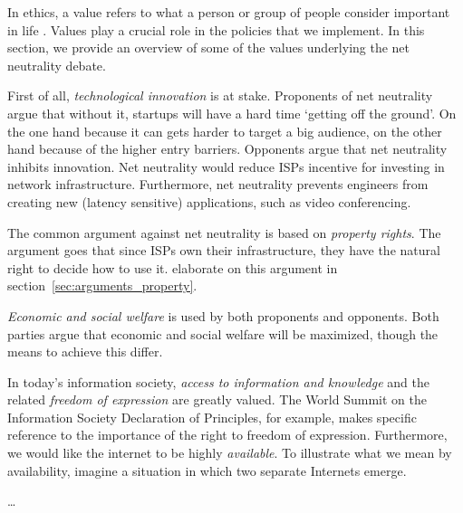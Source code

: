
In ethics, a value refers to what a person or group of people consider important in life \cite{friedman2006value}. Values play a crucial role in the policies that we implement. In this section, we provide an overview of some of the values underlying the net neutrality debate.

First of all, \emph{technological innovation} is at stake. Proponents of net neutrality argue that without it, startups will have a hard time `getting off the ground'. On the one hand because it can gets harder to target a big audience, on the other hand because of the higher entry barriers. Opponents argue that net neutrality inhibits innovation. Net neutrality would reduce \acp{ISP} incentive for investing in network infrastructure. Furthermore, net neutrality prevents engineers from creating new (latency sensitive) applications, such as video conferencing.

The common argument against net neutrality is based on \emph{property rights}. The argument goes that since \acp{ISP} own their infrastructure, they have the natural right to decide how to use it.  elaborate on this argument in section~\ref{sec:arguments_property}.

\emph{Economic and social welfare} is used by both proponents and opponents. Both parties argue that economic and social welfare will be maximized, though the means to achieve this differ.

In today's information society, \emph{access to information and knowledge} and the related \emph{freedom of expression} are greatly valued. The World Summit on the Information Society Declaration of Principles, for example, makes specific reference to the importance of the right to freedom of expression. Furthermore, we would like the internet to be highly \emph{available}. To illustrate what we mean by availability, imagine a situation in which two separate Internets emerge.

\ldots